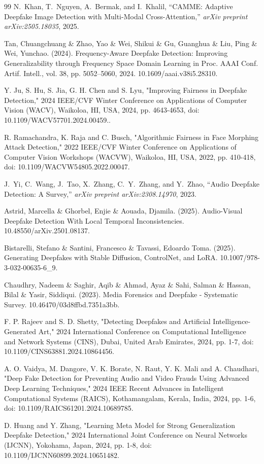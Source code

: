 \documentclass[conference]{IEEEtran}
\begin{document}
\begin{thebibliography}{99}
N.~Khan, T.~Nguyen, A.~Bermak, and I.~Khalil,
``CAMME: Adaptive Deepfake Image Detection with Multi-Modal Cross-Attention,''
\emph{arXiv preprint arXiv:2505.18035}, 2025.

Tan, Chuangchuang \& Zhao, Yao \& Wei, Shikui \& Gu, Guanghua \& Liu, Ping \& Wei, Yunchao. (2024). Frequency-Aware Deepfake Detection: Improving Generalizability through Frequency Space Domain Learning in Proc. AAAI Conf. Artif. Intell., vol. 38, pp. 5052--5060, 2024.
 10.1609/aaai.v38i5.28310. 

Y. Ju, S. Hu, S. Jia, G. H. Chen and S. Lyu, "Improving Fairness in Deepfake Detection," 2024 IEEE/CVF Winter Conference on Applications of Computer Vision (WACV), Waikoloa, HI, USA, 2024, pp. 4643-4653, doi: 10.1109/WACV57701.2024.00459..

R. Ramachandra, K. Raja and C. Busch, "Algorithmic Fairness in Face Morphing Attack Detection," 2022 IEEE/CVF Winter Conference on Applications of Computer Vision Workshops (WACVW), Waikoloa, HI, USA, 2022, pp. 410-418, doi: 10.1109/WACVW54805.2022.00047.

J.~Yi, C.~Wang, J.~Tao, X.~Zhang, C.~Y.~Zhang, and Y.~Zhao,
``Audio Deepfake Detection: A Survey,''
\emph{arXiv preprint arXiv:2308.14970}, 2023.

Astrid, Marcella \& Ghorbel, Enjie \& Aouada, Djamila. (2025). Audio-Visual Deepfake Detection With Local Temporal Inconsistencies. 10.48550/arXiv.2501.08137. 


Bistarelli, Stefano \& Santini, Francesco \& Tavassi, Edoardo Toma. (2025). Generating Deepfakes with Stable Diffusion, ControlNet, and LoRA. 10.1007/978-3-032-00635-6\_9. 

Chaudhry, Nadeem \& Saghir, Aqib \& Ahmad, Ayaz \& Sahi, Salman \& Hassan, Bilal \& Yasir, Siddiqui. (2023). Media Forensics and Deepfake - Systematic Survey. 10.46470/03d8ffbd.7351a3bb. 

F. P. Rajeev and S. D. Shetty, "Detecting Deepfakes and Artificial Intelligence-Generated Art," 2024 International Conference on Computational Intelligence and Network Systems (CINS), Dubai, United Arab Emirates, 2024, pp. 1-7, doi: 10.1109/CINS63881.2024.10864456.

A. O. Vaidya, M. Dangore, V. K. Borate, N. Raut, Y. K. Mali and A. Chaudhari, "Deep Fake Detection for Preventing Audio and Video Frauds Using Advanced Deep Learning Techniques," 2024 IEEE Recent Advances in Intelligent Computational Systems (RAICS), Kothamangalam, Kerala, India, 2024, pp. 1-6, doi: 10.1109/RAICS61201.2024.10689785.

D. Huang and Y. Zhang, "Learning Meta Model for Strong Generalization Deepfake Detection," 2024 International Joint Conference on Neural Networks (IJCNN), Yokohama, Japan, 2024, pp. 1-8, doi: 10.1109/IJCNN60899.2024.10651482.

\end{thebibliography}
\end{document}
